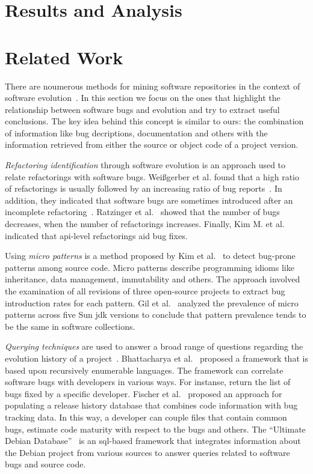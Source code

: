 \documentclass[conference]{IEEEtran}
\begin{document}
\section{Results and Analysis}
\label{sec:res}

\section{Related Work}
\label{sec:rel}

There are noumerous methods for mining software repositories in the context
of software evolution~\cite{KCM07}. In this section we focus on the ones
that highlight the relationship between software bugs and evolution and try to
extract useful conclusions. The key idea behind this concept is
similar to ours: the combination of information like bug decriptions,
documentation and others with the information retrieved from either the source
or object code of a project version.

{\it Refactoring identification} through software evolution is an approach used to
relate refactorings with software bugs. Wei{\ss}gerber et al. found that a high
ratio of refactorings is usually followed by an increasing ratio of bug
reports~\cite{WD06}. In addition, they indicated that software bugs are sometimes introduced
after an incomplete refactoring~\cite{GW05}.
Ratzinger et al.~\cite{RSG08} showed that the number of bugs decreases, when the number of
refactorings increases. Finally, Kim M. et al.~\cite{KCK11} indicated that {\sc api}-level
refactorings aid bug fixes.

Using {\it micro patterns} is a method proposed by Kim et al.~\cite{KPW06}
to detect bug-prone patterns among source code. Micro patterns describe programming
idioms like inheritance, data management, immutability and others. The approach involved
the examination of all revisions of three open-source projects to extract bug
introduction rates for each pattern. Gil et al.~\cite{GM05} analyzed the
prevalence of micro patterns across five Sun {\sc jdk} versions to conclude that
pattern prevalence tends to be the same in software collections.

{\it Querying techniques} are used to answer a broad range of questions
regarding the evolution history of a project~\cite{HG05}. Bhattacharya et
al.~\cite{BN11, B11} proposed a framework that is based upon
recursively enumerable languages. The framework can correlate software
bugs with developers in various ways. For instanse, return the list of
bugs fixed by a specific developer. Fischer et al.~\cite{FPG03} proposed
an approach for populating a release history database that combines code
information with bug tracking data. In this way, a developer can couple files
that contain common bugs, estimate code maturity with respect to the bugs
and others. The ``Ultimate Debian Database''~\cite{NZ10} is an {\sc sql}-based
framework that integrates information about the Debian project from various
sources to answer queries related to software bugs and source code.
\end{document}
